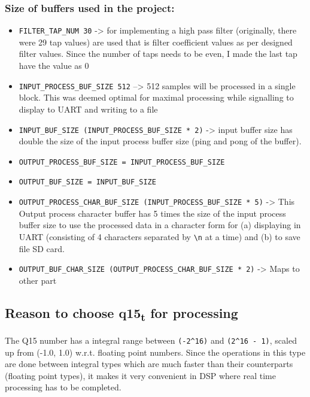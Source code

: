 \documentclass[11pt]{article}
\begin{document}
\subsubsection*{Size of buffers used in the project:}
\label{sec:orgfbb94ba}
\begin{itemize}
\item \texttt{FILTER\_TAP\_NUM 30} -> for implementing a high pass filter (originally, there were 29 tap values) are used that is filter coefficient values as per designed filter values. Since the number of taps needs to be even, I made the last tap have the value as 0
\item \texttt{INPUT\_PROCESS\_BUF\_SIZE 512} –> 512 samples will be processed in a single block. This was deemed optimal for maximal processing while signalling to display to UART and writing to a file
\item \texttt{INPUT\_BUF\_SIZE (INPUT\_PROCESS\_BUF\_SIZE * 2)} -> input buffer size has double the size of the input process buffer size (ping and pong of the buffer).
\item \texttt{OUTPUT\_PROCESS\_BUF\_SIZE = INPUT\_PROCESS\_BUF\_SIZE}
\item \texttt{OUTPUT\_BUF\_SIZE = INPUT\_BUF\_SIZE}
\item \texttt{OUTPUT\_PROCESS\_CHAR\_BUF\_SIZE (INPUT\_PROCESS\_BUF\_SIZE * 5)} -> This Output process character buffer has 5 times the size of the input process buffer size to use the processed data in a character form for (a) displaying in UART (consisting of 4 characters separated by \texttt{\textbackslash{}n} at a time) and (b) to save file SD card.
\item \texttt{OUTPUT\_BUF\_CHAR\_SIZE (OUTPUT\_PROCESS\_CHAR\_BUF\_SIZE * 2)} -> Maps to other part
\end{itemize}

\subsection{Reason to choose q15\textsubscript{t} for processing}
\label{sec:org1d7cee3}

The Q15 number has a integral range between \texttt{(-2\textasciicircum{}16)} and \texttt{(2\textasciicircum{}16 - 1)}, scaled up from (-1.0, 1.0) w.r.t. floating point numbers. Since the operations in this type are done between integral types which are much faster than their counterparts (floating point types), it makes it very convenient in DSP where real time processing has to be completed.
\end{document}
